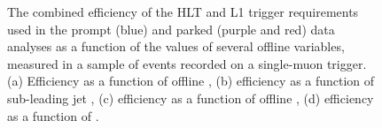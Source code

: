 \begin{figure}
  \caption{The combined efficiency of the \ac{HLT} and \ac{L1} trigger requirements used in the prompt (blue) and parked (purple and red) data analyses as a function of the values of several offline variables, measured in a sample of events recorded on a single-muon trigger. (a) Efficiency as a function of offline \detajj, (b) efficiency as a function of sub-leading jet \pt, (c) efficiency as a function of offline \MET, (d) efficiency as a function of \Mjj.}
  \label{fig:prompttrigplots2}
\end{figure}

